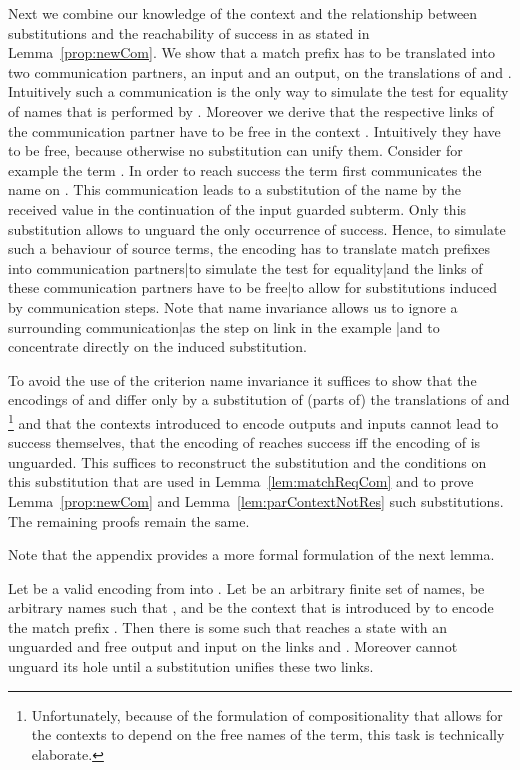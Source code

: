 \documentclass[final,copyright,creativecommons]{eptcs}
\begin{document}
Next we combine our knowledge of the context  and the relationship between substitutions and the reachability of success in \piNM as stated in Lemma~\ref{prop:newCom}. We show that a match prefix  has to be translated into two communication partners, \ie an input and an output, on the translations of  and . Intuitively such a communication is the only way to simulate the test for equality of names that is performed by . Moreover we derive that the respective links of the communication partner have to be free in the context . Intuitively they have to be free, because otherwise no substitution can unify them. Consider for example the term . In order to reach success the term first communicates the name  on . This communication leads to a substitution of the name  by the received value  in the continuation of the input guarded subterm. Only this substitution allows to unguard the only occurrence of success. Hence, to simulate such a behaviour of source terms, the encoding has to translate match prefixes into communication {partners}|{to} simulate the test for {equality}|{and} the links of these communication partners have to be {free}|{to} allow for substitutions induced by communication steps. Note that name invariance allows us to ignore a surrounding {communication}|{as} the step on link  in the example |{and} to concentrate directly on the induced substitution.

To avoid the use of the criterion name invariance it suffices to show that the encodings of  and  differ only by a substitution of (parts of) the translations of  and \footnote{Unfortunately, because of the formulation of compositionality that allows for the contexts to depend on the free names of the term, this task is technically elaborate.} and that the contexts introduced to encode outputs and inputs cannot lead to success themselves, \ie that the encoding of  reaches success iff the encoding of  is unguarded. This suffices to reconstruct the substitution and the conditions on this substitution that are used in Lemma~\ref{lem:matchReqCom} and to prove Lemma~\ref{prop:newCom} and Lemma~\ref{lem:parContextNotRes} \wrt such substitutions. The remaining proofs remain the same.

Note that the appendix provides a more formal formulation of the next lemma.

\begin{lemma}
	\label{lem:matchReqCom}
	Let \encod be a valid encoding from \piT into \piNM.
	Let  be an arbitrary finite set of names,
	 be arbitrary names such that ,
	and  be the context that is introduced by  to encode the match prefix .
	Then there is some  such that  reaches a state with an unguarded and free output and input on the links  and . Moreover  cannot unguard its hole until a substitution unifies these two links.
\end{lemma}
\end{document}
